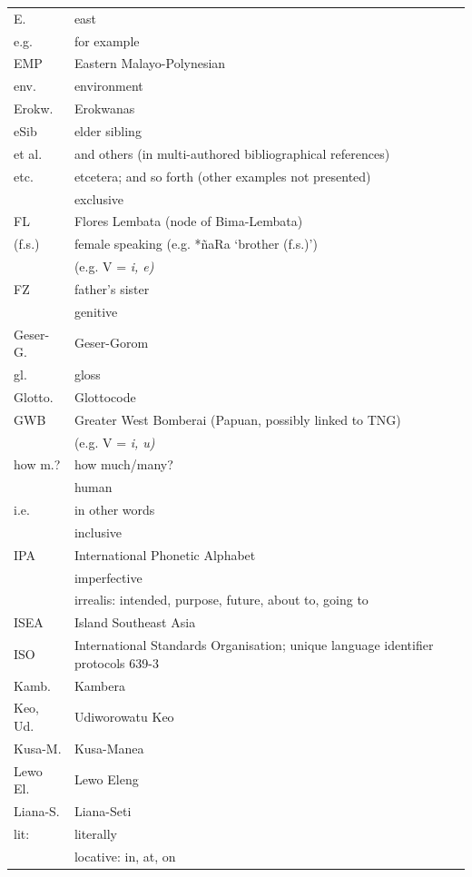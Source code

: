 {\begin{xltabular}{\textwidth}[l]{l>{\raggedright\arraybackslash}X}
E.	&	east	\\
e.g.	&	for example	\\
EMP	&	Eastern Malayo-Polynesian	\\
env.	&	environment	\\
Erokw.	&	Erokwanas	\\
eSib	&	elder sibling	\\
et al.	&	and others (in multi-authored bibliographical references)	\\
etc.	&	etcetera; and so forth (other examples not presented)	\\
	&	exclusive	\\
FL	&	Flores Lembata (node of Bima-Lembata) \\
(f.s.)	&	female speaking (e.g. *ñaRa ‘brother (f.s.)’)	\\
	&	 (e.g. V = \it{i, e})	\\
FZ	&	father's sister	\\
	&	genitive	\\
Geser-G.	&	Geser-Gorom	\\
gl.	&	gloss	\\
Glotto.	&	Glottocode \citep{Hammarstrom2023}	\\
GWB	&	Greater West Bomberai (Papuan, possibly linked to TNG)	\\
	&	 (e.g. V\tsc{[+high]} = \it{i, u})	\\
how m.?	&	how much/many?	\\
	&	human 	\\
i.e.	&	in other words	\\
	&	inclusive	\\
IPA	&	International Phonetic Alphabet	\\
	&	imperfective	\\
	&	irrealis: intended, purpose, future, about to, going to	\\
ISEA	&	Island Southeast Asia	\\
ISO	&	International Standards Organisation; unique language identifier protocols 639-3 	\\
Kamb.	&	Kambera	\\
Keo, Ud.	&	Udiworowatu Keo	\\
Kusa-M.	&	Kusa-Manea	\\
Lewo El.	&	Lewo Eleng	\\
Liana-S.	&	Liana-Seti	\\
lit:	&	literally	\\
	&	locative: in, at, on	\\

\end{xltabular}}

